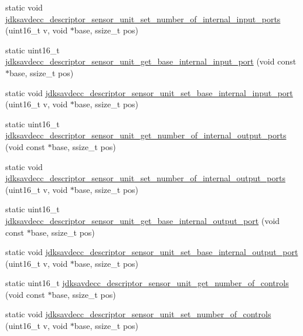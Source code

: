 \begin{DoxyCompactItemize}
\item 
static void \hyperlink{group__descriptor__sensor_gad50e2fe7e7d62e84983e02acc00b8b9d}{jdksavdecc\+\_\+descriptor\+\_\+sensor\+\_\+unit\+\_\+set\+\_\+number\+\_\+of\+\_\+internal\+\_\+input\+\_\+ports} (uint16\+\_\+t v, void $\ast$base, ssize\+\_\+t pos)
\item 
static uint16\+\_\+t \hyperlink{group__descriptor__sensor_ga7087a03d95cefe2cd32db4457d0c5493}{jdksavdecc\+\_\+descriptor\+\_\+sensor\+\_\+unit\+\_\+get\+\_\+base\+\_\+internal\+\_\+input\+\_\+port} (void const $\ast$base, ssize\+\_\+t pos)
\item 
static void \hyperlink{group__descriptor__sensor_gaa690164aa3f909046fc090cfb50da99f}{jdksavdecc\+\_\+descriptor\+\_\+sensor\+\_\+unit\+\_\+set\+\_\+base\+\_\+internal\+\_\+input\+\_\+port} (uint16\+\_\+t v, void $\ast$base, ssize\+\_\+t pos)
\item 
static uint16\+\_\+t \hyperlink{group__descriptor__sensor_ga7894fb7137bf57538b73173d64b0f152}{jdksavdecc\+\_\+descriptor\+\_\+sensor\+\_\+unit\+\_\+get\+\_\+number\+\_\+of\+\_\+internal\+\_\+output\+\_\+ports} (void const $\ast$base, ssize\+\_\+t pos)
\item 
static void \hyperlink{group__descriptor__sensor_gaa4cb939335d258b621cf8b48a3627c3b}{jdksavdecc\+\_\+descriptor\+\_\+sensor\+\_\+unit\+\_\+set\+\_\+number\+\_\+of\+\_\+internal\+\_\+output\+\_\+ports} (uint16\+\_\+t v, void $\ast$base, ssize\+\_\+t pos)
\item 
static uint16\+\_\+t \hyperlink{group__descriptor__sensor_ga9472660337e9837c736087c68d1b817d}{jdksavdecc\+\_\+descriptor\+\_\+sensor\+\_\+unit\+\_\+get\+\_\+base\+\_\+internal\+\_\+output\+\_\+port} (void const $\ast$base, ssize\+\_\+t pos)
\item 
static void \hyperlink{group__descriptor__sensor_gaa18f18db4acd31f6964e6e113257e1d7}{jdksavdecc\+\_\+descriptor\+\_\+sensor\+\_\+unit\+\_\+set\+\_\+base\+\_\+internal\+\_\+output\+\_\+port} (uint16\+\_\+t v, void $\ast$base, ssize\+\_\+t pos)
\item 
static uint16\+\_\+t \hyperlink{group__descriptor__sensor_ga0f1c675a85a83a3ff5eed7103f8067ff}{jdksavdecc\+\_\+descriptor\+\_\+sensor\+\_\+unit\+\_\+get\+\_\+number\+\_\+of\+\_\+controls} (void const $\ast$base, ssize\+\_\+t pos)
\item 
static void \hyperlink{group__descriptor__sensor_ga7119d8f25637338070dccabad4b4989f}{jdksavdecc\+\_\+descriptor\+\_\+sensor\+\_\+unit\+\_\+set\+\_\+number\+\_\+of\+\_\+controls} (uint16\+\_\+t v, void $\ast$base, ssize\+\_\+t pos)

\end{DoxyCompactItemize}

